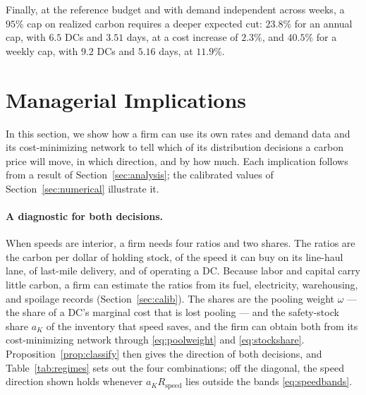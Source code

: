 \documentclass[11pt]{article}
\numberwithin{proposition}{section}
\theoremstyle{definition}
\theoremstyle{remark}
\theoremstyle{plain}
\begin{document}
Finally, at the reference budget and with demand independent across weeks, a $95\%$ cap on realized carbon
requires a deeper expected cut: $23.8\%$ for an annual cap, with $6.5$ DCs and $3.51$ days, at a cost increase of
$2.3\%$, and $40.5\%$ for a weekly cap, with $9.2$ DCs and $5.16$ days, at $11.9\%$.

\section{Managerial Implications}\label{sec:managerial}

In this section, we show how a firm can use its own rates and demand data and its cost-minimizing network to
tell which of its distribution decisions a carbon price will move, in which direction, and by
how much. Each implication follows from a result of Section~\ref{sec:analysis}; the calibrated values of
Section~\ref{sec:numerical} illustrate it.

\paragraph{A diagnostic for both decisions.} When speeds are interior, a firm needs four ratios and two shares. The ratios are the carbon
per dollar of holding stock, of the speed it can buy on its line-haul lane, of last-mile delivery, and of
operating a DC. Because labor and capital carry little carbon, a firm can estimate the ratios from its fuel, electricity,
warehousing, and spoilage records (Section~\ref{sec:calib}). The shares
are the pooling weight $\omega$ --- the share of a DC's marginal cost that is lost pooling ---
and the safety-stock share $a_K$ of the inventory that speed saves, and the firm can obtain both from its
cost-minimizing network through \eqref{eq:poolweight} and \eqref{eq:stockshare}. Proposition~\ref{prop:classify}
then gives the direction of both decisions, and Table~\ref{tab:regimes} sets out the four combinations; off the diagonal,
the speed direction shown holds whenever $a_KR_{\mathrm{speed}}$ lies outside the bands \eqref{eq:speedbands}.
\end{document}
